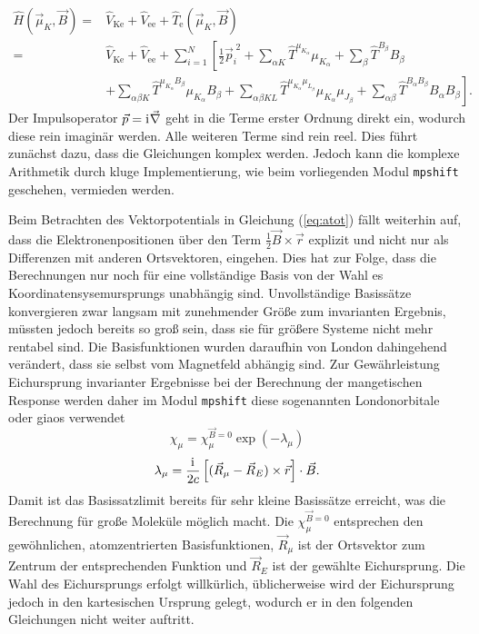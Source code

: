 	\begin{equation}\label{eq:hvonbmu}
	\begin{aligned}
	\hat{H}(\vec{\mu}_K,\vec{B})=&\hat{V}_{\textrm{Ke}}+\hat{V}_{\textrm{ee}}+\hat{T}_\textrm{e}(\vec{\mu}_K,\vec{B})\\
	=&\hat{V}_{\textrm{Ke}}+\hat{V}_{\textrm{ee}}+\sum_{i=1}^N\left[\frac{1}{2}\vec{p}_i^{\; 2}+\sum_{\alpha K}\hat{T}^{\mu_{K_\alpha}}\mu_{K_\alpha}+\sum_\beta\hat{T}^{B_\beta}B_\beta\right. \\
	&+\left.\sum_{\alpha\beta K}\hat{T}^{\mu_{K_\alpha}B_\beta}\mu_{K_\alpha}B_\beta+\sum_{\alpha\beta KL}\hat{T}^{\mu_{K_\alpha}\mu_{L_\beta}}\mu_{K_\alpha}\mu_{J_\beta}+\sum_{\alpha\beta}\hat{T}^{B_\alpha B_\beta}B_\alpha B_\beta\right].
	\end{aligned}
	\end{equation}
	Der Impulsoperator $\vec{p}=\mathrm{i}\mkern1mu\vec{\nabla}$ geht in die Terme erster Ordnung direkt ein, wodurch diese rein imaginär werden. Alle weiteren Terme sind rein reel. Dies führt zunächst dazu, dass die Gleichungen komplex werden. Jedoch kann die komplexe Arithmetik durch kluge Implementierung, wie beim vorliegenden Modul \texttt{mpshift} geschehen, vermieden werden. 
	
	Beim Betrachten des Vektorpotentials in Gleichung (\ref{eq:atot}) fällt weiterhin auf, dass die Elektronenpositionen über den Term $\frac{1}{2}\vec{B}\times
	\vec{r}$ explizit und nicht nur als Differenzen mit anderen Ortsvektoren, eingehen. Dies hat zur Folge, dass die Berechnungen nur noch für eine vollständige Basis von der Wahl es Koordinatensysemursprungs unabhängig sind. Unvollständige Basissätze konvergieren zwar langsam mit zunehmender Größe zum invarianten Ergebnis, müssten jedoch bereits so groß sein, dass sie für größere Systeme nicht mehr rentabel sind. Die Basisfunktionen wurden daraufhin von London\supercite{london1937theorie} dahingehend verändert, dass sie selbst vom Magnetfeld abhängig sind. Zur Gewährleistung Eichursprung invarianter Ergebnisse bei der Berechnung der mangetischen Response werden daher im Modul \texttt{mpshift} diese sogenannten Londonorbitale oder \acp{giao}\supercite{ditchfield1974self,london1937theorie} verwendet
	\begin{equation}\label{eq:giao}
	  \chi_\mu=\chi_\mu^{\vec{B}=0}\exp(-\lambda_\mu)
	\end{equation}
	\begin{equation}
	  \lambda_\mu=\frac{\mathrm{i}\mkern1mu}{2c}\left[(\vec{R}_\mu-\vec{R}_E)\times \vec{r}\right]\cdot \vec{B}.
  	\end{equation}
  	Damit ist das Basissatzlimit bereits für sehr kleine Basissätze erreicht\supercite{van2012use}, was die Berechnung für große Moleküle möglich macht. Die $\chi_\mu^{\vec{B}=0}$ entsprechen den gewöhnlichen, atomzentrierten Basisfunktionen, $\vec{R}_\mu$ ist der Ortsvektor zum Zentrum der entsprechenden Funktion und $\vec{R}_E$ ist der gewählte Eichursprung. Die Wahl des Eichursprungs erfolgt willkürlich, üblicherweise wird der Eichursprung jedoch in den kartesischen Ursprung gelegt, wodurch er in den folgenden Gleichungen nicht weiter auftritt. 
  	
